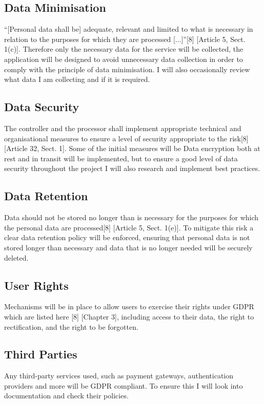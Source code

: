 \documentclass[]{project_report}
\begin{document}
\subsection{Data Minimisation}
“[Personal data shall be] adequate, relevant and limited to what is necessary in relation to the purposes for which they are processed [...]”[8] [Article 5, Sect. 1(c)]. Therefore only the necessary data for the service will be collected, the application will be designed to avoid unnecessary data collection in order to comply with the principle of data minimisation. I will also occasionally review what data I am collecting and if it is required.

\subsection{Data Security}
The controller and the processor shall implement appropriate technical and organisational measures to ensure a level of security appropriate to the risk[8] [Article 32, Sect. 1]. Some of the initial measures will be Data encryption both at rest and in transit will be implemented, but to ensure a good level of data security throughout the project I will also research and implement best practices.

\subsection{Data Retention}
Data should not be stored no longer than is necessary for the purposes for which the personal data are processed[8] [Article 5, Sect. 1(e)]. To mitigate this risk a clear data retention policy will be enforced, ensuring that personal data is not stored longer than necessary and data that is no longer needed will be securely deleted.

\subsection{User Rights}
Mechanisms will be in place to allow users to exercise their rights under GDPR which are listed here [8] [Chapter 3], including access to their data, the right to rectification, and the right to be forgotten.

\subsection{Third Parties}
Any third-party services used, such as payment gateways, authentication providers and more will be GDPR compliant. To ensure this I will look into documentation and check their policies.\newline
\end{document}
